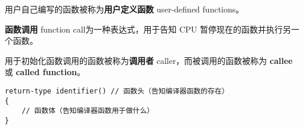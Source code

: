 \documentclass[../../LearnCpp.tex]{subfiles}
\begin{document}


用户自己编写的函数被称为\textbf{用户定义函数} user-defined functions。

\textbf{函数调用} function call为一种表达式，用于告知 CPU 暂停现在的函数并执行另一个函数。

用于初始化函数调用的函数被称为\textbf{调用者} caller，而被调用的函数被称为 \textbf{callee} 或 \textbf{called function}。

\begin{lstlisting}
return-type identifier() // 函数头（告知编译器函数的存在）
{
    // 函数体（告知编译器函数用于做什么）
}
\end{lstlisting}
\end{document}
